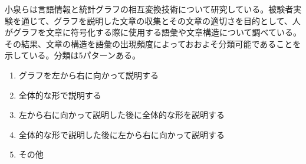 \documentclass{matsushita-zemi}
\begin{document}



小泉らは言語情報と統計グラフの相互変換技術について研究している\cite{interconversion}。被験者実験を通じて、グラフを説明した文章の収集とその文章の適切さを目的として、人がグラフを文章に符号化する際に使用する語彙や文章構造について調べている。その結果、文章の構造を語彙の出現頻度によっておおよそ分類可能であることを示している。分類は5パターンある。
\begin{enumerate}
 \item グラフを左から右に向かって説明する
 \item 全体的な形で説明する
 \item 左から右に向かって説明した後に全体的な形を説明する
 \item 全体的な形で説明した後に左から右に向かって説明する
 \item その他
\end{enumerate}
\end{document}
